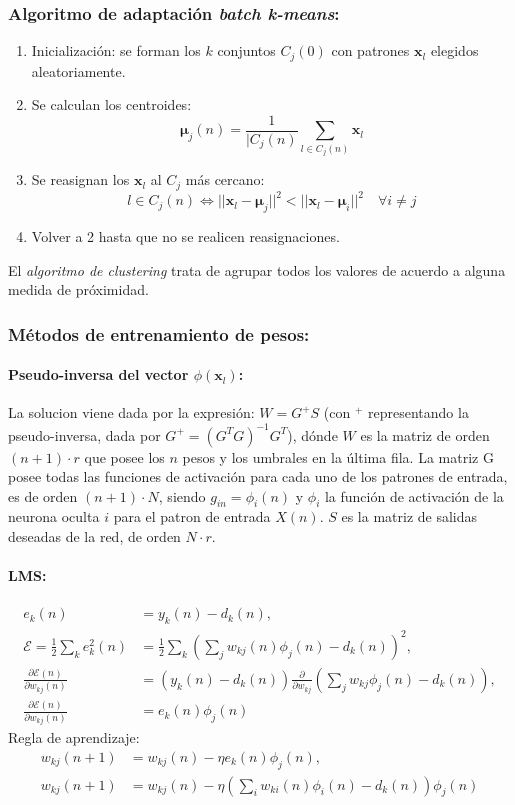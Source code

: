 \documentclass[10pt,a4paper]{article}
\begin{document}
\subsubsection{Algoritmo de adaptación \textit{batch k-means}:}
\begin{enumerate}
\item Inicialización: se forman los $k$ conjuntos $C_j(0)$ con patrones $\mathbf{x}_l$ elegidos aleatoriamente.
\item Se calculan los centroides:
\[\mathbf{\mu}_j(n) = \frac{1}{|C_j(n)}\sum_{l\in C_j(n)} \mathbf{x}_l\]
\item Se reasignan los $\mathbf{x}_l$ al $C_j$ más cercano:
\[ l \in C_j(n) \iff ||\mathbf{x}_l -\mathbf{\mu}_j||^2 < ||\mathbf{x}_l -\mathbf{\mu}_i||^2 \quad \forall i\neq j\]
\item Volver a 2 hasta que no se realicen reasignaciones.
\end{enumerate}

El \textit{algoritmo de clustering} trata de agrupar todos los valores de acuerdo a alguna medida de próximidad.

\subsubsection{Métodos de entrenamiento de pesos:}
\paragraph{Pseudo-inversa del vector $\phi(\mathbf{x}_l)$:} La solucion viene dada por la expresión: $W = G^{+} S$ (con $^+$ representando la pseudo-inversa, dada por $G^+=(G^T G)^{-1}G^T$), dónde $W$ es la matriz de orden $(n+1)\cdot r$ que posee los $n$ pesos y los umbrales en la última fila. La matriz G posee todas las funciones de activación para cada uno de los patrones de entrada, es de orden $(n+1)\cdot N$, siendo $g_{in} = \phi_i(n)$ y $\phi_i$ la función de activación de la neurona oculta $i$ para el patron de entrada $X(n)$. $S$ es la matriz de salidas deseadas de la red, de orden $N\cdot r$.

\paragraph{LMS:}
\begin{align*}
e_k(n) &= y_k(n)-d_k(n) ,\\
\mathcal{E} = \frac{1}{2} \sum_k e^2_k(n) &= \frac{1}{2} \sum_k \left(\sum_j w_{kj}(n)\phi_j(n)-d_k(n)\right)^2 ,\\
\frac{\partial \mathcal{E}(n)}{\partial w_{kj}(n)} &= (y_k(n) - d_k(n))\frac{\partial}{\partial w_{kj}} \left(\sum_j w_{kj} \phi_j(n) - d_k(n)\right), \\
\frac{\partial \mathcal{E}(n)}{\partial w_{kj}(n)} &= e_k(n) \phi_j(n)
\end{align*}
Regla de aprendizaje:
\begin{align*}
w_{kj}(n+1) &= w_{kj}(n) -\eta e_k(n) \phi_j(n) ,\\
w_{kj}(n+1) &= w_{kj}(n) -\eta \left(\sum_i w_{ki}(n) \phi_i(n) - d_k(n) \right) \phi_j(n)
\end{align*}
\end{document}
